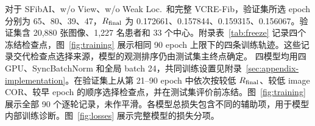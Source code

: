 对于 SFibAI、w/o View、w/o Weak Loc.\ 和完整 VCRE-Fib，验证集所选 epoch 分别为 65、80、39、47，$R_{\mathrm{final}}$ 为 0.172661、0.157844、0.159315、0.156067。验证集含 20,880 张图像、1,227 名患者和 33 个中心。附录表~\ref{tab:freeze} 记录四个冻结检查点，图~\ref{fig:training} 展示相同 90 epoch 上限下的四条训练轨迹。这些记录交代检查点选择来源，模型的观测排序仍由测试集主终点确定。
四模型均用四 GPU、SyncBatchNorm 和全局 batch 24，共同训练设置见附录~\ref{sec:appendix-implementation}。在验证集上从第 21--90 epoch 中依次按较低 $R_{\mathrm{final}}$、较低 image COR、较早 epoch 的顺序选择检查点，并在测试集评价前冻结。图~\ref{fig:training} 展示全部 90 个逐轮记录，未作平滑。各模型总损失包含不同的辅助项，用于模型内部训练诊断。图~\ref{fig:losses} 展示完整模型的损失分项。

\FloatBarrier

